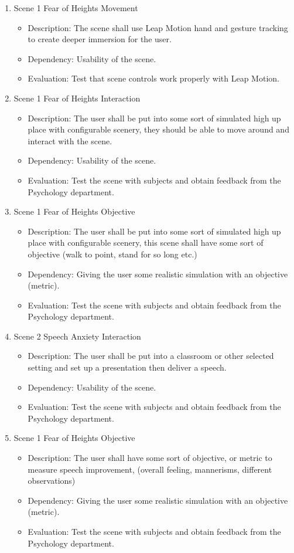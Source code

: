 \documentclass[a4paper,10pt]{article}
\begin{document}
\begin{enumerate}
		\item Scene 1 Fear of Heights Movement 
		\begin{itemize}
		\item Description: The scene shall use Leap Motion hand and gesture tracking to create deeper immersion for the user.
		\item Dependency: Usability of the scene.
		\item Evaluation: Test that scene controls work properly with Leap Motion. 
		\end{itemize}
		
		\item Scene 1 Fear of Heights Interaction 
		\begin{itemize}
		\item Description: The user shall be put into some sort of simulated high up place with configurable scenery, they should be able to move around and interact with the scene.
		\item Dependency: Usability of the scene.
		\item Evaluation: Test the scene with subjects and obtain feedback from the Psychology department. 
		\end{itemize}
		
		
		\item Scene 1 Fear of Heights Objective 
		\begin{itemize}
		\item Description: The user shall be put into some sort of simulated high up place with configurable scenery, this scene shall have some sort of objective (walk to point, stand for so long etc.)
		\item Dependency: Giving the user some realistic simulation with an objective (metric).
		\item Evaluation: Test the scene with subjects and obtain feedback from the Psychology department. 
		\end{itemize}
		
		\item Scene 2 Speech Anxiety Interaction
		\begin{itemize}
		\item Description: The user shall be put into a classroom or other selected setting and set up a presentation then deliver a speech.
		\item Dependency: Usability of the scene.
		\item Evaluation: Test the scene with subjects and obtain feedback from the Psychology department.  
		\end{itemize}
		\item Scene 1 Fear of Heights Objective 
		\begin{itemize}
		\item Description: The user shall have some sort of objective, or metric to measure speech improvement, (overall feeling, mannerisms, different observations)
		\item Dependency: Giving the user some realistic simulation with an objective (metric).
		\item Evaluation: Test the scene with subjects and obtain feedback from the Psychology department. 
		\end{itemize}
		

\end{enumerate}
\end{document}
